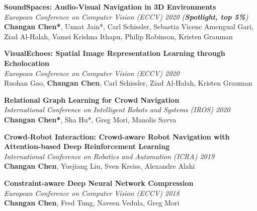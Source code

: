\documentclass[margin, 10pt]{res} %
\begin{document}
\begin{resume}
\textbf{SoundSpaces: Audio-Visual Navigation in 3D Environments} \\
\textit{European Conference on Computer Vision (ECCV) 2020 (\textbf{Spotlight, top 5\%})} \\
\textbf{Changan Chen*}, Unnat Jain*, Carl Schissler, Sebastia Vicenc Amengual Gari, Ziad Al-Halah, Vamsi Krishna Ithapu, Philip Robinson, Kristen Grauman

\textbf{VisualEchoes: Spatial Image Representation Learning through Echolocation} \\
\textit{European Conference on Computer Vision (ECCV) 2020} \\
Ruohan Gao, \textbf{Changan Chen}, Carl Schissler, Ziad Al-Halah, Kristen Grauman

\textbf{Relational Graph Learning for Crowd Navigation} \\
\textit{International Conference on Intelligent Robots and Systems (IROS) 2020} \\
\textbf{Changan Chen*}, Sha Hu*, Greg Mori, Manolis Savva

\textbf{Crowd-Robot Interaction: Crowd-aware Robot Navigation with Attention-based Deep Reinforcement Learning} \\
\textit{International Conference on Robotics and Automation (ICRA) 2019} \\
\textbf{Changan Chen}, Yuejiang Liu, Sven Kreiss, Alexandre Alahi

\textbf{Constraint-aware Deep Neural Network Compression} \\
\textit{European Conference on Computer Vision (ECCV) 2018} \\
\textbf{Changan Chen}, Fred Tung, Naveen Vedula, Greg Mori



\end{resume}
\end{document}
